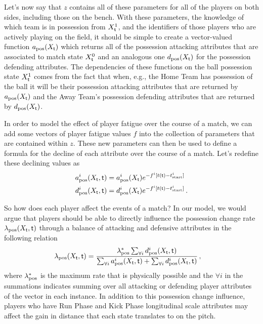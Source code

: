 Let's now say that $z$ contains all of these parameters for all of the players on both sides, including those on the bench. With these parameters, the knowledge of which team is in possession from $X^1_{\sf t}$, and the identifiers of those players who are actively playing on the field, it should be simple to create a vector-valued function $a_{\rm pos}(X_{\sf t})$ which returns all of the possession attacking attributes that are associated to match state $X^0_{\sf t}$ and an analogous one $d_{\rm pos}(X_{\sf t})$ for the possession defending attributes. The dependencies of these functions on the ball possession state $X^1_{\sf t}$ comes from the fact that when, e.g., the {\sf Home Team} has possession of the ball it will be their possession attacking attributes that are returned by $a_{\rm pos}(X_{\sf t})$ and the {\sf Away Team}'s possession defending attributes that are returned by $d_{\rm pos}(X_{\sf t})$.

In order to model the effect of player fatigue over the course of a match, we can add some vectors of player fatigue values $f$ into the collection of parameters that are contained within $z$. These new parameters can then be used to define a formula for the decline of each attribute over the course of a match. Let's redefine these declining values as
\begin{align}
a^i_{\rm pos}(X_{\sf t}, {\sf t}) &= a^i_{\rm pos}(X_{\sf t})e^{-f^i[t({\sf t})-t^i_{\rm start}]} \label{eq:att-player-fatigue} \\
d^i_{\rm pos}(X_{\sf t}, {\sf t}) &= d^i_{\rm pos}(X_{\sf t})e^{-f^i[t({\sf t})-t^i_{\rm start}]} \label{eq:def-player-fatigue} \,.
\end{align}

So how does each player affect the events of a match? In our model, we would argue that players should be able to directly influence the possession change rate $\lambda_{\rm pos}(X_{\sf t}, {\sf t})$ through a balance of attacking and defensive attributes in the following relation
\begin{align}
\lambda_{\rm pos}(X_{\sf t}, {\sf t}) &= \frac{\lambda^*_{\rm pos}\sum_{\forall i}d^i_{\rm pos}(X_{\sf t}, {\sf t})}{\sum_{\forall i}a^i_{\rm pos}(X_{\sf t}, {\sf t}) + \sum_{\forall i}d^i_{\rm pos}(X_{\sf t}, {\sf t})}\,,
\end{align}
where $\lambda^*_{\rm pos}$ is the maximum rate that is physically possible and the $\forall i$ in the summations indicates summing over all attacking or defending player attributes of the vector in each instance. In addition to this possession change influence, players who have {\sf Run Phase} and {\sf Kick Phase} longitudinal scale attributes may affect the gain in distance that each state translates to on the pitch. 

